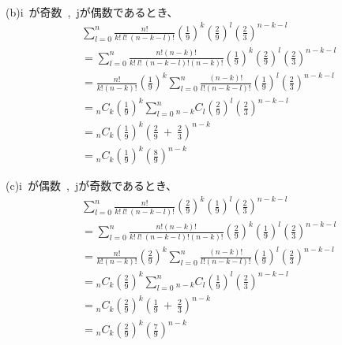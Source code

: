 \documentclass[12pt,a4paper]{jsarticle}
\begin{document}
~\\
(b)i~が奇数~,~jが偶数であるとき、\\
\begin{align*}
    & \sum^n_{l = 0} \frac{n!}{k!~l!~(n-k-l)!} \left(\frac{1}{9}\right)^k \left(\frac{2}{9}\right)^l \left(\frac{2}{3}\right)^{n-k-l} \\
    &= \sum^n_{l = 0} \frac{n!(n-k)!}{k!~l!~(n-k-l)!(n-k)!} \left(\frac{1}{9}\right)^k \left(\frac{2}{9}\right)^l \left(\frac{2}{3}\right)^{n-k-l} \\
    &= \frac{n!}{k!(n-k)!}\left(\frac{1}{9}\right)^k \sum^n_{l = 0}\frac{(n-k)!}{l!(n-k-l)!}\left(\frac{1}{9}\right)^l\left(\frac{2}{3}\right)^{n-k-l} \\
    &= {}_n C_k \left(\frac{1}{9}\right)^k \sum^n_{l = 0} {}_{n-k} C_l \left(\frac{2}{9}\right)^l\left(\frac{2}{3}\right)^{n-k-l} \\
    &= {}_n C_k \left(\frac{1}{9}\right)^k \left(\frac{2}{9}~+~\frac{2}{3}\right)^{n-k} \\
    &= {}_n C_k \left(\frac{1}{9}\right)^k \left(\frac{8}{9}\right)^{n-k}
\end{align*}

(c)i~が偶数~,~jが奇数であるとき、\\
\begin{align*}
    & \sum^n_{l = 0} \frac{n!}{k!~l!~(n-k-l)!} \left(\frac{2}{9}\right)^k \left(\frac{1}{9}\right)^l \left(\frac{2}{3}\right)^{n-k-l} \\
    &= \sum^n_{l = 0} \frac{n!(n-k)!}{k!~l!~(n-k-l)!(n-k)!} \left(\frac{2}{9}\right)^k \left(\frac{1}{9}\right)^l \left(\frac{2}{3}\right)^{n-k-l} \\
    &= \frac{n!}{k!(n-k)!}\left(\frac{2}{9}\right)^k \sum^n_{l = 0}\frac{(n-k)!}{l!(n-k-l)!}\left(\frac{1}{9}\right)^l\left(\frac{2}{3}\right)^{n-k-l} \\
    &= {}_n C_k \left(\frac{2}{9}\right)^k \sum^n_{l = 0} {}_{n-k} C_l \left(\frac{1}{9}\right)^l\left(\frac{2}{3}\right)^{n-k-l} \\
    &= {}_n C_k \left(\frac{2}{9}\right)^k \left(\frac{1}{9}~+~\frac{2}{3}\right)^{n-k} \\
    &= {}_n C_k \left(\frac{2}{9}\right)^k \left(\frac{7}{9}\right)^{n-k}
\end{align*}
\end{document}
